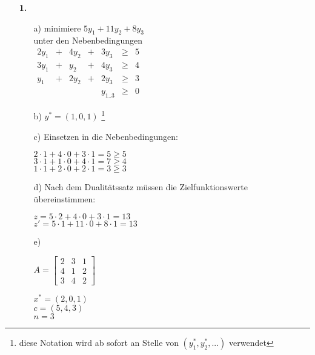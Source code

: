 \documentclass[a4paper,11pt]{article}
\author{\authorinfo}
\title{\titleinfo}
\date{\today}
\begin{document}
\maketitle
\begin{enumerate}
\item[\textbf{1.}]
    \begin{enumerate}
    \item[a)]
        minimiere \( 5y_1 + 11y_2 + 8y_3 \)\\
        unter den Nebenbedingungen \\
        \(\begin{array}{rcrcrcrcr}
            2y_1 & + & 4y_2 & + & 3y_3 & \geq & 5\\
            3y_1 & + &  y_2 & + & 4y_3 & \geq & 4\\
             y_1 & + & 2y_2 & + & 2y_3 & \geq & 3\\
            &&&& y_{1..3} & \geq & 0
        \end{array}\)

    \item[b)]
        \( y^* = (1, 0, 1) \) \footnote{diese Notation wird ab sofort an Stelle von $(y_1^*, y_2^*, ...)$ verwendet}

    \item[c)]
        Einsetzen in die Nebenbedingungen:

        \( 2 \cdot 1 + 4 \cdot 0 + 3 \cdot 1 = 5 \geq 5 \)\\
        \( 3 \cdot 1 + 1 \cdot 0 + 4 \cdot 1 = 7 \geq 4 \)\\
        \( 1 \cdot 1 + 2 \cdot 0 + 2 \cdot 1 = 3 \geq 3 \)

    \item[d)]
        Nach dem Dualitätssatz müssen die Zielfunktionswerte übereinstimmen:

        \( z =  5 \cdot 2 + 4 \cdot 0 + 3 \cdot 1 = 13 \)\\
        \( z' = 5 \cdot 1 + 11 \cdot 0 + 8 \cdot 1 = 13 \)

    \item[e)]
        \quad\begin{multicols}{3}
            \( A = \begin{bmatrix} 2 & 3 & 1 \\ 4 & 1 & 2 \\ 3 & 4 & 2 \end{bmatrix}  \)

            \( x^* = (2, 0, 1) \)\\
            \( c = (5, 4, 3) \)\\
            \( n = 3 \)


\end{multicols}
\end{enumerate}
\end{enumerate}
\end{document}
